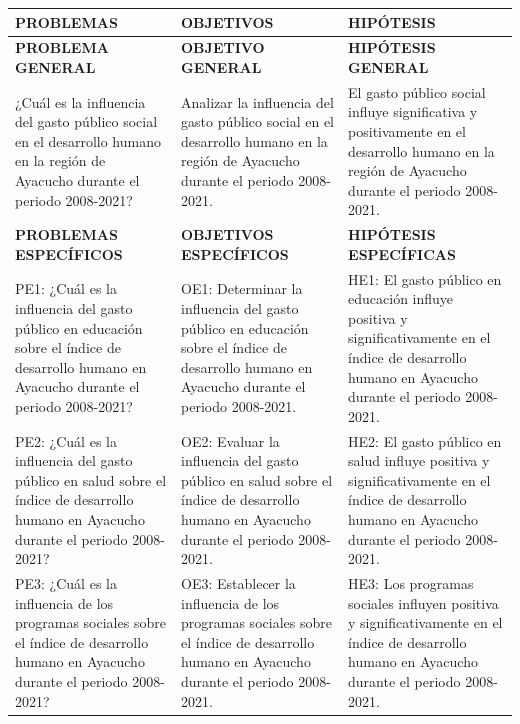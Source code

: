 \documentclass[
  man,
  floatsintext,
  longtable,
  a4paper,
  nolmodern,
  notxfonts,
  notimes,
  12pt,
  colorlinks=true,linkcolor=blue,citecolor=blue,urlcolor=blue]{apa7}
\newcounter{none} %
\begin{document}
{\def\LTcaptype{none} %
\begin{longtable}[]{@{}
  >{\raggedright\arraybackslash}p{}
  >{\raggedright\arraybackslash}p{}
  >{\raggedright\arraybackslash}p{}@{}}
\toprule\noalign{}
\begin{minipage}[b]{\linewidth}\raggedright
PROBLEMAS
\end{minipage} & \begin{minipage}[b]{\linewidth}\raggedright
OBJETIVOS
\end{minipage} & \begin{minipage}[b]{\linewidth}\raggedright
HIPÓTESIS
\end{minipage} \\
\midrule\noalign{}
\endhead
\bottomrule\noalign{}
\endlastfoot
\textbf{PROBLEMA GENERAL} & \textbf{OBJETIVO GENERAL} &
\textbf{HIPÓTESIS GENERAL} \\
¿Cuál es la influencia del gasto público social en el desarrollo humano
en la región de Ayacucho durante el periodo 2008-2021? & Analizar la
influencia del gasto público social en el desarrollo humano en la región
de Ayacucho durante el periodo 2008-2021. & El gasto público social
influye significativa y positivamente en el desarrollo humano en la
región de Ayacucho durante el periodo 2008-2021. \\
\textbf{PROBLEMAS ESPECÍFICOS} & \textbf{OBJETIVOS ESPECÍFICOS} &
\textbf{HIPÓTESIS ESPECÍFICAS} \\
PE1: ¿Cuál es la influencia del gasto público en educación sobre el
índice de desarrollo humano en Ayacucho durante el periodo 2008-2021? &
OE1: Determinar la influencia del gasto público en educación sobre el
índice de desarrollo humano en Ayacucho durante el periodo 2008-2021. &
HE1: El gasto público en educación influye positiva y significativamente
en el índice de desarrollo humano en Ayacucho durante el periodo
2008-2021. \\
PE2: ¿Cuál es la influencia del gasto público en salud sobre el índice
de desarrollo humano en Ayacucho durante el periodo 2008-2021? & OE2:
Evaluar la influencia del gasto público en salud sobre el índice de
desarrollo humano en Ayacucho durante el periodo 2008-2021. & HE2: El
gasto público en salud influye positiva y significativamente en el
índice de desarrollo humano en Ayacucho durante el periodo 2008-2021. \\
PE3: ¿Cuál es la influencia de los programas sociales sobre el índice de
desarrollo humano en Ayacucho durante el periodo 2008-2021? & OE3:
Establecer la influencia de los programas sociales sobre el índice de
desarrollo humano en Ayacucho durante el periodo 2008-2021. & HE3: Los
programas sociales influyen positiva y significativamente en el índice
de desarrollo humano en Ayacucho durante el periodo 2008-2021. \\
\end{longtable}
}
\end{document}
